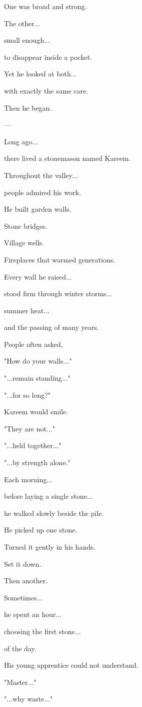 \documentclass[12pt,openany]{book}
\begin{document}
One was broad and strong.

The other...

small enough...

to disappear inside a pocket.

Yet he looked at both...

with exactly the same care.

Then he began.

---

Long ago...

there lived a stonemason named Kareem.

Throughout the valley...

people admired his work.

He built garden walls.

Stone bridges.

Village wells.

Fireplaces that warmed generations.

Every wall he raised...

stood firm through winter storms...

summer heat...

and the passing of many years.

People often asked,

"How do your walls..."

"...remain standing..."

"...for so long?"

Kareem would smile.

"They are not..."

"...held together..."

"...by strength alone."

Each morning...

before laying a single stone...

he walked slowly beside the pile.

He picked up one stone.

Turned it gently in his hands.

Set it down.

Then another.

Sometimes...

he spent an hour...

choosing the first stone...

of the day.

His young apprentice could not understand.

"Master..."

"...why waste..."
\end{document}
